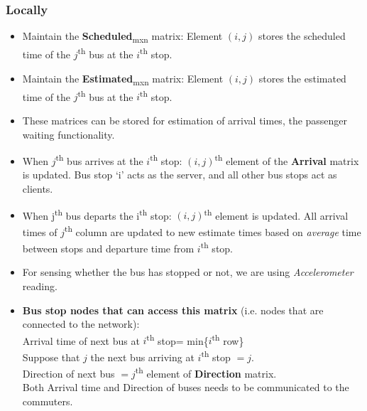 \subsubsection{Locally}

\begin{itemize}

\item Maintain the \textbf{Scheduled}\textsubscript{mxn} matrix: Element $(i, j)$ stores the scheduled time of the $j$\textsuperscript{th} bus at the $i$\textsuperscript{th} stop.
\item Maintain the \textbf{Estimated}\textsubscript{mxn} matrix: Element $(i, j)$ stores the estimated time of the $j$\textsuperscript{th} bus at the $i$\textsuperscript{th} stop.
\item These matrices can be stored for estimation of arrival times, the passenger waiting functionality.
\item When $j$\textsuperscript{th} bus arrives at the $i$\textsuperscript{th} stop: $(i, j)$\textsuperscript{th} element of the \textbf{Arrival} matrix is updated. Bus stop `i' acts as the server, and all other bus stops act as clients.
\item When j\textsuperscript{th} bus departs the i\textsuperscript{th} stop: $(i, j)$\textsuperscript{th} element is updated. All arrival times of $j$\textsuperscript{th} column are updated to new estimate times based on \textit{average} time between stops and departure time from $i$\textsuperscript{th} stop.
\item For sensing whether the bus has stopped or not, we are using \textit{Accelerometer} reading.
\item \textbf{Bus stop nodes that can access this matrix} (i.e. nodes that are connected to the network):\\
\null \qquad Arrival time of next bus at $i$\textsuperscript{th} stop= min\{$i$\textsuperscript{th} row\}\\
\null \qquad Suppose that $j$ the next bus arriving at $i$\textsuperscript{th} stop $= j$.\\
\null \qquad Direction of next bus $= j$\textsuperscript{th} element of \textbf{Direction} matrix.\\
\null \qquad Both Arrival time and Direction of buses needs to be communicated to the commuters.


\end{itemize}
